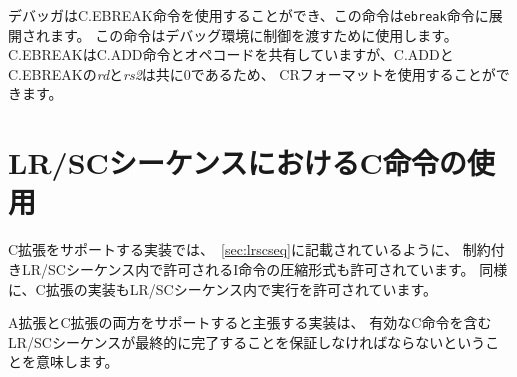\begin{comment}
Debuggers can use the C.EBREAK instruction, which expands to {\tt ebreak},
to cause control to be transferred back to the debugging environment.
C.EBREAK shares the opcode with the C.ADD instruction, but with {\em
  rd} and {\em rs2} both zero, thus can also use the CR format.
\end{comment}
デバッガはC.EBREAK命令を使用することができ、この命令は{\tt ebreak}命令に展開されます。
この命令はデバッグ環境に制御を渡すために使用します。
C.EBREAKはC.ADD命令とオペコードを共有していますが、C.ADDとC.EBREAKの{\em rd}と{\em rs2}は共に0であるため、
CRフォーマットを使用することができます。

\begin{comment}
\section{Usage of C Instructions in LR/SC Sequences}
\end{comment}
\section{LR/SCシーケンスにおけるC命令の使用}

\begin{comment}
On implementations that support the C extension, compressed forms of the
I instructions permitted inside constrained LR/SC sequences, as described in
Section~\ref{sec:lrscseq}, are also permitted inside constrained LR/SC
sequences.
\end{comment}
C拡張をサポートする実装では、~\ref{sec:lrscseq}に記載されているように、
制約付きLR/SCシーケンス内で許可されるI命令の圧縮形式も許可されています。
同様に、C拡張の実装もLR/SCシーケンス内で実行を許可されています。

\begin{commentary}
\begin{comment}
The implication is that any implementation that claims to support both
the A and C extensions must ensure that LR/SC sequences containing
valid C instructions will eventually complete.
\end{comment}
A拡張とC拡張の両方をサポートすると主張する実装は、
有効なC命令を含むLR/SCシーケンスが最終的に完了することを保証しなければならないということを意味します。
\end{commentary}

\begin{comment}
\section{HINT Instructions}
\end{comment}
